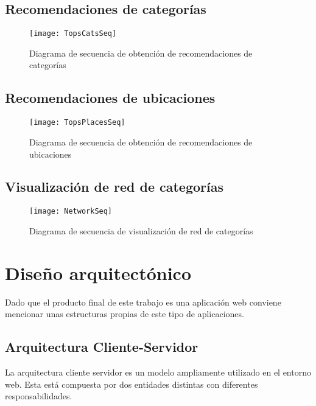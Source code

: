 \subsection{Recomendaciones de categorías}
	\begin{figure}[!h]
	\centering
	\texttt{[image: TopsCatsSeq]}
	\caption{Diagrama de secuencia de obtención de recomendaciones de categorías}\label{TopsCatsSeq}
\end{figure}
\FloatBarrier
\newpage
\subsection{Recomendaciones de ubicaciones}
	\begin{figure}[!h]
	\centering
	\texttt{[image: TopsPlacesSeq]}
	\caption{Diagrama de secuencia de obtención de recomendaciones de ubicaciones}\label{TopsPlacesSeq}
\end{figure}
\FloatBarrier

\newpage
\subsection{Visualización de red de categorías}
	\begin{figure}[!h]
	\centering
	\texttt{[image: NetworkSeq]}
	\caption{Diagrama de secuencia de visualización de red de categorías}\label{NetworkSeq}
\end{figure}
\FloatBarrier
\newpage

\section{Diseño arquitectónico}

Dado que el producto final de este trabajo es una aplicación web conviene mencionar unas estructuras propias de este tipo de aplicaciones.

\subsection{Arquitectura Cliente-Servidor}
La arquitectura cliente servidor es un modelo ampliamente utilizado en el entorno web. Esta está compuesta por dos entidades distintas con diferentes responsabilidades.

